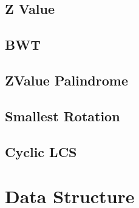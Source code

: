\documentclass[a4paper,10pt,twocolumn,oneside]{article}
\begin{document}
% 

\subsection{Z Value}


\subsection{BWT}


\subsection{ZValue Palindrome}


\subsection{Smallest Rotation}


%

\subsection{Cyclic LCS}


\section{Data Structure}

% 

% 
\end{document}
